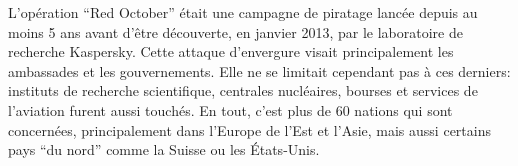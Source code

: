 \documentclass[article, french]{yReport}
\begin{document}
	L'opération \enquote{Red October} était une campagne de piratage lancée depuis au moins 5 ans avant d'être découverte, en janvier 2013, par le laboratoire de recherche Kaspersky. Cette attaque d'envergure visait principalement les ambassades et les gouvernements. Elle ne se limitait cependant pas à ces derniers: instituts de recherche scientifique, centrales nucléaires, bourses et services de l'aviation furent aussi touchés. En tout, c'est plus de 60 nations qui sont concernées, principalement dans l'Europe de l'Est et l'Asie, mais aussi certains pays \enquote{du nord} comme la Suisse ou les États-Unis.
	
\end{document}
